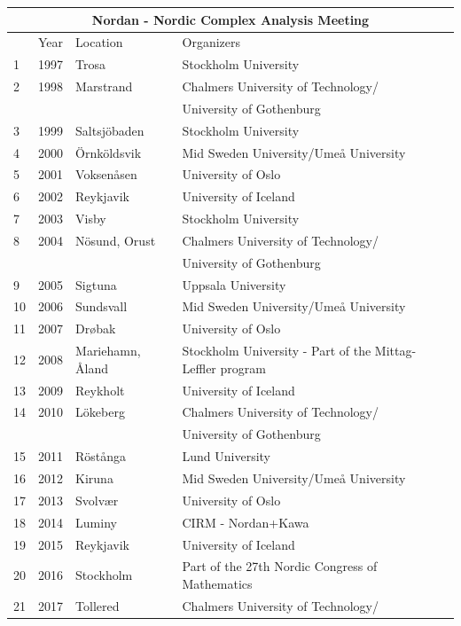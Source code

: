\documentclass[12pt,openany]{report}      %
\begin{document}
\begin{tabular}{llll}
    \toprule
    \multicolumn{4}{c}{Nordan - Nordic Complex Analysis Meeting}\\
    \midrule
     & Year & Location & Organizers \\
     \midrule
    1 & 1997 & Trosa & Stockholm University  \\
    2 & 1998 & Marstrand & Chalmers University of Technology/\\
      &      &               & University of Gothenburg \\
    3 & 1999 & Saltsjöbaden & Stockholm University  \\
    4 & 2000 & Örnköldsvik & Mid Sweden University/Umeå University\\
    5 & 2001 & Voksenåsen & University of Oslo \\
    6 & 2002 & Reykjavik & University of Iceland \\
    7 & 2003 & Visby & Stockholm University\\
    8 & 2004 & Nösund, Orust & Chalmers University of Technology/\\
       &      &               & University of Gothenburg \\
    9 & 2005 & Sigtuna & Uppsala University \\
    10 & 2006 & Sundsvall & Mid Sweden University/Umeå University \\
    11 & 2007 & Drøbak & University of Oslo\\
    12 & 2008 & Mariehamn, Åland & Stockholm University - Part of the Mittag-Leffler program\\
    13 & 2009 & 
    Reykholt & University of Iceland\\
    14 & 2010 & Lökeberg & Chalmers University of Technology/\\
       &      &               & University of Gothenburg\\
    15 & 2011 & Röstånga & Lund University\\
    16 & 2012 & Kiruna & Mid Sweden University/Umeå University\\
    17 & 2013 & Svolvær & University of Oslo\\
    18 & 2014 & Luminy & CIRM - Nordan+Kawa\\
    19 & 2015 & Reykjavik & University of Iceland\\
    20 & 2016 & Stockholm & Part of the 27th Nordic Congress of Mathematics\\
    21 & 2017 & Tollered & Chalmers University of Technology/\\

\end{tabular}
\end{document}
